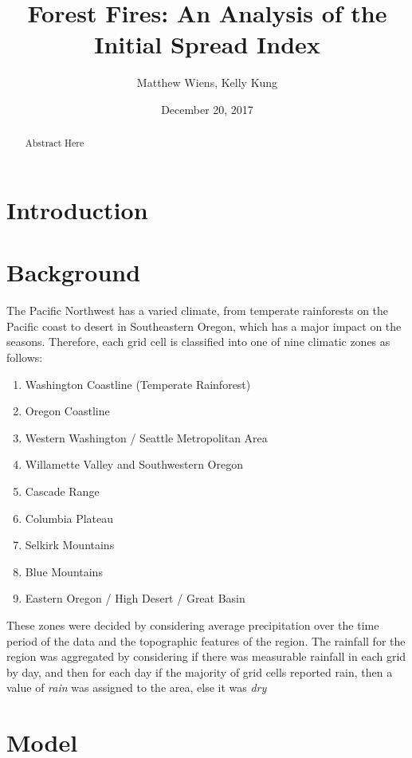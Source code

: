 \documentclass{article}
\begin{document}
\title{Forest Fires: An Analysis of the Initial Spread Index}
\author{Matthew Wiens, Kelly Kung}
\date{December 20, 2017}
\maketitle
\begin{abstract}
Abstract Here
\end{abstract}

\section{Introduction}

\section{Background}

The Pacific Northwest has a varied climate, from temperate rainforests on the Pacific coast to desert in Southeastern Oregon, which has a major impact on the seasons. Therefore, each grid cell is classified into one of nine climatic zones as follows:
\begin{enumerate}
\item Washington Coastline (Temperate Rainforest)
\item Oregon Coastline
\item Western Washington / Seattle Metropolitan Area
\item Willamette Valley and Southwestern Oregon
\item Cascade Range
\item Columbia Plateau
\item Selkirk Mountains
\item Blue Mountains
\item Eastern Oregon / High Desert / Great Basin
\end{enumerate}
These zones were decided by considering average precipitation over the time period of the data and the topographic features of the region. The rainfall for the region was aggregated by considering if there was measurable rainfall in each grid by day, and then for each day if the majority of grid cells reported rain, then a value of \textit{rain} was assigned to the area, else it was \textit{dry}



\section{Model}
\end{document}
